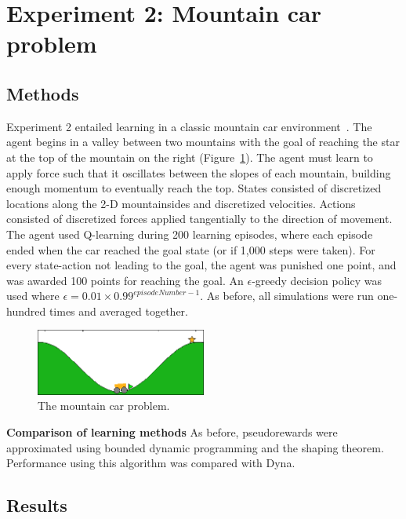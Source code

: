 \documentclass[letterpaper]{article}
\begin{document}
\section{Experiment 2: Mountain car problem}

\subsection{Methods}

Experiment 2 entailed learning in a classic mountain car environment~\cite{moore1990efficient, sutton1996generalization, sutton1998reinforcement, smart2000practical, rasmussen2003gaussian, whiteson2006evolutionary, heidrich2008variable, sutton2012dyna}. The agent begins in a valley between two mountains with the goal of reaching the star at the top of the mountain on the right (Figure~\ref{fig:mc}). The agent must learn to apply force such that it oscillates between the slopes of each mountain, building enough momentum to eventually reach the top. States consisted of discretized locations along the 2-D mountainsides and discretized velocities. Actions consisted of discretized forces applied tangentially to the direction of movement. The agent used Q-learning during 200 learning episodes, where each episode ended when the car reached the goal state (or if 1,000 steps were taken). For every state-action not leading to the goal, the agent was punished one point, and was awarded 100 points for reaching the goal. An $\epsilon$-greedy decision policy was used where $\epsilon=0.01\times0.99^{episodeNumber-1}$. As before, all simulations were run one-hundred times and averaged together.

\begin{figure}[ht]
\centering
\includegraphics[width=0.5\textwidth]{Mcar}
\caption{The mountain car problem.}
\label{fig:mc}
\end{figure}

\noindent
\textbf{Comparison of learning methods} As before, pseudorewards were approximated using bounded dynamic programming and the shaping theorem. Performance using this algorithm was compared with Dyna.

\subsection{Results}
\end{document}
